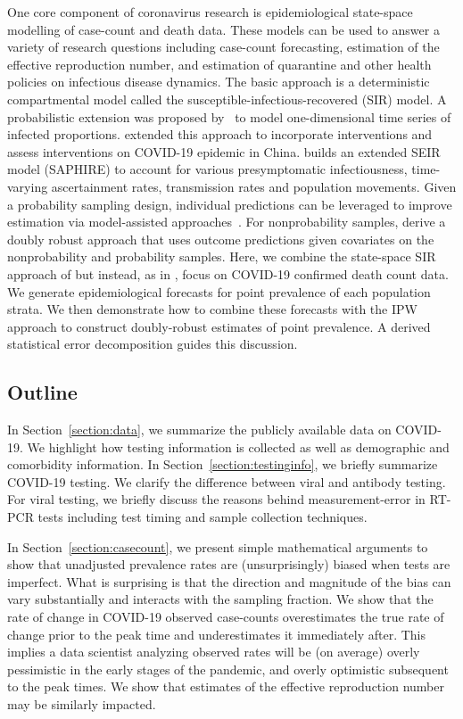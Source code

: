 \documentclass[11pt]{amsart}
\begin{document}
One core component of coronavirus research is epidemiological state-space modelling of case-count and death data. These models can be used to answer a variety of research questions including case-count forecasting, estimation of the effective reproduction number, and estimation of quarantine and other health policies on infectious disease dynamics.  The basic approach is a deterministic compartmental model called the susceptible-infectious-recovered (SIR) model.  A probabilistic extension was proposed by~\cite{Osthus2017} to model one-dimensional time series of infected proportions. \cite{Song2020} extended this approach to incorporate interventions and assess interventions on COVID-19 epidemic in China. \cite{Hao2020} builds an extended SEIR model (SAPHIRE) to account for various presymptomatic infectiousness, time-varying ascertainment rates, transmission rates and population movements. Given a probability sampling design, individual predictions can be leveraged to improve estimation via model-assisted approaches~\citep{Breidt2017}.  For nonprobability samples, \cite{Chen2019} derive a doubly robust approach that uses outcome predictions given covariates on the nonprobability and probability samples.  Here, we combine the state-space SIR approach of \cite{Song2020} but instead, as in \cite{Johndrow2020}, focus on COVID-19 confirmed death count data.  We generate epidemiological forecasts for point prevalence of each population strata.  We then demonstrate how to combine these forecasts with the IPW approach to construct doubly-robust estimates of point prevalence.  A derived statistical error decomposition guides this discussion.


\subsection{Outline}

In Section~\ref{section:data}, we summarize the publicly available data on COVID-19.  We highlight how testing information is collected as well as demographic and comorbidity information.  In Section~\ref{section:testinginfo}, we briefly summarize COVID-19 testing.  We clarify the difference between viral and antibody testing.  For viral testing, we briefly discuss the reasons behind measurement-error in RT-PCR tests including test timing and sample collection techniques.

In Section~\ref{section:casecount}, we present simple mathematical arguments to show that unadjusted prevalence rates are (unsurprisingly) biased when tests are imperfect. What is surprising is that the direction and magnitude of the bias can vary substantially and interacts with the sampling fraction.  We show that the rate of change in COVID-19 observed case-counts overestimates the true rate of change prior to the peak time and underestimates it immediately after.  This implies a data scientist analyzing observed rates will be (on average) overly pessimistic in the early stages of the pandemic, and overly optimistic subsequent to the peak times.  We show that estimates of the effective reproduction number may be similarly impacted.
\end{document}
